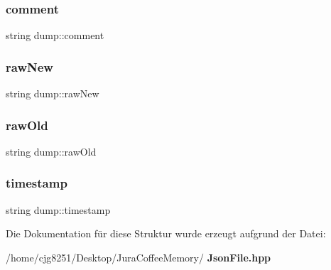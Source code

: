 \subsubsection{comment}
{\footnotesize\ttfamily string dump\+::comment}

\mbox{\label{structdump_ae4d6663749d924b5a6a6492fd0f2e5c9}} 
\subsubsection{raw\+New}
{\footnotesize\ttfamily string dump\+::raw\+New}

\mbox{\label{structdump_af8e9a1a3591db469d894ae6f8cda72ba}} 
\subsubsection{raw\+Old}
{\footnotesize\ttfamily string dump\+::raw\+Old}

\mbox{\label{structdump_a2a7d870c0dac48b5d60ade3587773a5b}} 
\subsubsection{timestamp}
{\footnotesize\ttfamily string dump\+::timestamp}



Die Dokumentation für diese Struktur wurde erzeugt aufgrund der Datei\+:\begin{DoxyCompactItemize}
\item 
/home/cjg8251/\+Desktop/\+Jura\+Coffee\+Memory/\textbf{ Json\+File.\+hpp}\end{DoxyCompactItemize}
